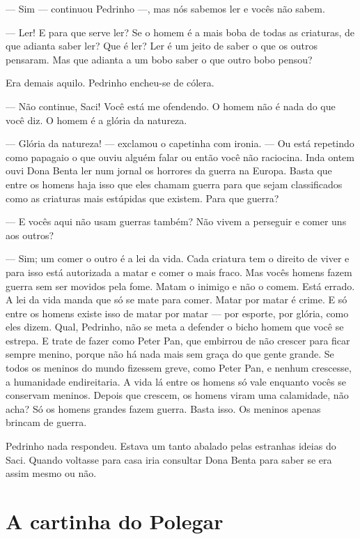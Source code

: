 --- Sim --- continuou Pedrinho ---, mas nós sabemos ler e vocês não
sabem.

--- Ler! E para que serve ler? Se o homem é a mais boba de todas as
criaturas, de que adianta saber ler? Que é ler? Ler é um jeito de saber
o que os outros pensaram. Mas que adianta a um bobo saber o que outro
bobo pensou?

Era demais aquilo. Pedrinho encheu-se de cólera.

--- Não continue, Saci! Você está me ofendendo. O homem não é nada do
que você diz. O homem é a glória da natureza.

--- Glória da natureza! --- exclamou o capetinha com ironia. --- Ou está
repetindo como papagaio o que ouviu alguém falar ou então você não
raciocina. Inda ontem ouvi Dona Benta ler num jornal os horrores da
guerra na Europa. Basta que entre os homens haja isso que eles chamam
guerra para que sejam classificados como as criaturas mais estúpidas que
existem. Para que guerra?

--- E vocês aqui não usam guerras também? Não vivem a perseguir e comer
uns aos outros?

--- Sim; um comer o outro é a lei da vida. Cada criatura tem o direito
de viver e para isso está autorizada a matar e comer o mais fraco. Mas
vocês homens fazem guerra sem ser movidos pela fome. Matam o inimigo e
não o comem. Está errado. A lei da vida manda que só se mate para comer.
Matar por matar é crime. E só entre os homens existe isso de matar por
matar --- por esporte, por glória, como eles dizem. Qual, Pedrinho, não
se meta a defender o bicho homem que você se estrepa. E trate de fazer
como Peter Pan, que embirrou de não crescer para ficar sempre menino,
porque não há nada mais sem graça do que gente grande. Se todos os
meninos do mundo fizessem greve, como Peter Pan, e nenhum crescesse, a
humanidade endireitaria. A vida lá entre os homens só vale enquanto
vocês se conservam meninos. Depois que crescem, os homens viram uma
calamidade, não acha? Só os homens grandes fazem guerra. Basta isso. Os
meninos apenas brincam de guerra.

Pedrinho nada respondeu. Estava um tanto abalado pelas estranhas ideias
do Saci. Quando voltasse para casa iria consultar Dona Benta para saber
se era assim mesmo ou não.


\chapter{A cartinha do Polegar}

